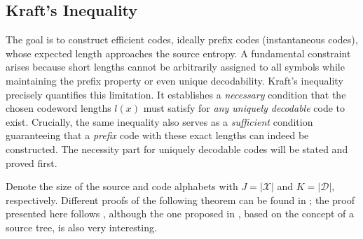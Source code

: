 \subsection{Kraft's Inequality}

The goal is to construct efficient codes, ideally prefix codes (instantaneous codes), whose expected length approaches the source entropy. A fundamental constraint arises because short lengths cannot be arbitrarily assigned to all symbols while maintaining the prefix property or even unique decodability. Kraft's inequality precisely quantifies this limitation. It establishes a \emph{necessary} condition that the chosen codeword lengths $l(x)$ must satisfy for \emph{any uniquely decodable} code to exist. Crucially, the same inequality also serves as a \emph{sufficient} condition guaranteeing that a \emph{prefix} code with these exact lengths can indeed be constructed. The necessity part for uniquely decodable codes will be stated and proved first.

Denote the size of the source and code alphabets with $J = |\mathcal{X}|$ and $K = |\mathcal{D}|$, respectively. Different proofs of the following theorem can be found in \cite{ElementsofInformationTheory, han2002mathematics}; the proof presented here follows \cite{han2002mathematics}, although the one proposed in \cite{ElementsofInformationTheory}, based on the concept of a source tree, is also very interesting.

